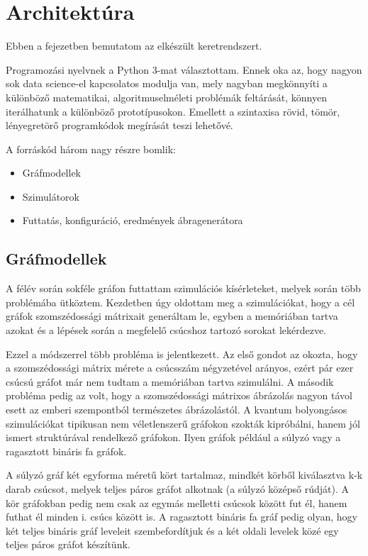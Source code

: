 \chapter{Architektúra}

Ebben a fejezetben bemutatom az elkészült keretrendszert.

Programozási nyelvnek a Python 3-mat választottam. Ennek oka az, hogy nagyon
sok data science-el kapcsolatos modulja van, mely nagyban megkönnyíti a
különböző matematikai, algoritmuselméleti problémák feltárását, könnyen
iterálhatunk a különböző prototípusokon. Emellett a szintaxisa rövid, tömör,
lényegretörő programkódok megírását teszi lehetővé.

A forráskód három nagy részre bomlik:
\begin{itemize}
  \item Gráfmodellek
  \item Szimulátorok
  \item Futtatás, konfiguráció, eredmények ábragenerátora
\end{itemize}

\section{Gráfmodellek}

A félév során sokféle gráfon futtattam szimulációs kísérleteket, melyek során
több problémába ütköztem. Kezdetben úgy oldottam meg a szimulációkat, hogy a
cél gráfok szomszédossági mátrixait generáltam le, egyben a memóriában tartva
azokat és a lépések során a megfelelő csúcshoz tartozó sorokat lekérdezve.

Ezzel a módszerrel több probléma is jelentkezett. Az első gondot az okozta,
hogy a szomszédossági mátrix mérete a csúcsszám négyzetével arányos, ezért pár
ezer csúcsú gráfot már nem tudtam a memóriában tartva szimulálni. A második
probléma pedig az volt, hogy a szomszédossági mátrixos ábrázolás nagyon távol
esett az emberi szempontból természetes ábrázolástól. A kvantum bolyongásos
szimulációkat tipikusan nem véletlenszerű gráfokon szokták kipróbálni, hanem
jól ismert struktúrával rendelkező gráfokon. Ilyen gráfok például a súlyzó vagy
a ragasztott bináris fa gráfok.

A súlyzó gráf két egyforma méretű kört tartalmaz, mindkét körből kiválasztva
k-k darab csúcsot, melyek teljes páros gráfot alkotnak (a súlyzó középső
rúdját). A kör gráfokban pedig nem csak az egymás melletti csúcsok között fut
él, hanem futhat él minden i. csúcs között is. A ragasztott bináris fa gráf
pedig olyan, hogy két teljes bináris gráf leveleit szembefordítjuk és a két
oldali levelek közé egy teljes páros gráfot készítünk.


